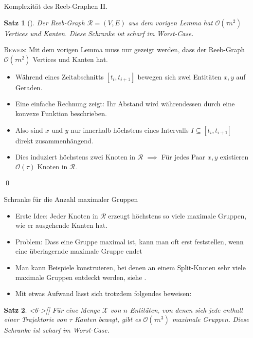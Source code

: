 \documentclass[
wide,
10pt,
xcolor={x11names,svgnames},
hyperref={pdfauthor={Jannes Bantje},colorlinks,urlcolor=maincolor,hidelinks=false,linkcolor=maincolor},
pantone312, 	%
euler-digits,
]{beamer}
\newtheorem{satz}{Satz}
\theoremstyle{definition}
\newenvironment{beweis}{\textsc{Beweis:}}{\qed}
\begin{document}
\begin{frame}{Komplexität des Reeb-Graphen II.}
    \begin{satz}[{\cite[Thm.~2]{buchin2015}}]
    	Der Reeb-Graph $\mathcal{R}=(V,E)$ aus dem vorigen Lemma hat $\mathcal{O}(\tau n^2)$ Vertices und Kanten.
    	Diese Schranke ist scharf im Worst-Case.
    \end{satz}
    \begin{beweis} \pause
        Mit dem vorigen Lemma muss nur gezeigt werden, dass der Reeb-Graph $\mathcal{O}(\tau n^2)$ Vertices und Kanten hat.\pause
        \begin{itemize}[<+->]
            \item Während eines Zeitabschnitts $[t_i,t_{i+1}]$ bewegen sich zwei Entitäten $x,y$ auf Geraden.
            \item Eine einfache Rechnung zeigt: Ihr Abstand wird währendessen durch eine konvexe Funktion beschrieben.
            \item Also sind $x$ und $y$ nur innerhalb höchstens eines Intervalls $I \subseteq [t_i,t_{i+1}]$ direkt zusammenhängend.
            \item Dies induziert höchstens zwei Knoten in $\mathcal{R}$ $\implies$ Für jedes Paar $x,y$ existieren $\mathcal{O}(\tau)$ Knoten in $\mathcal{R}$.
        \end{itemize}
    \end{beweis}
\end{frame}

\begin{frame}{Schranke für die Anzahl maximaler Gruppen}
    \pause
    \begin{itemize}[<+->]
        \item Erste Idee: Jeder Knoten in $\mathcal{R}$ erzeugt höchstens so viele maximale Gruppen, wie er ausgehende Kanten hat.
        \item Problem: Dass eine Gruppe maximal ist, kann man oft erst feststellen, wenn eine überlagernde maximale Gruppe endet
        \item Man kann Beispiele konstruieren, bei denen an einem Split-Knoten sehr viele maximale Gruppen entdeckt werden, siehe \cite[S.~81, Fig.~4]{buchin2015}.
        \item Mit etwas Aufwand lässt sich trotzdem folgendes beweisen:
    \end{itemize}
    \begin{satz}<6->[{\cite[Thm.~5]{buchin2015}}]
    	Für eine Menge $\mathcal{X}$ von $n$ Entitäten, von denen sich jede enthalt einer Trajektorie von $\tau$ Kanten bewegt, gibt es $\mathcal{O}(\tau n^3)$ maximale Gruppen.
    	Diese Schranke ist scharf im Worst-Case.
    \end{satz}
\end{frame}
\end{document}
